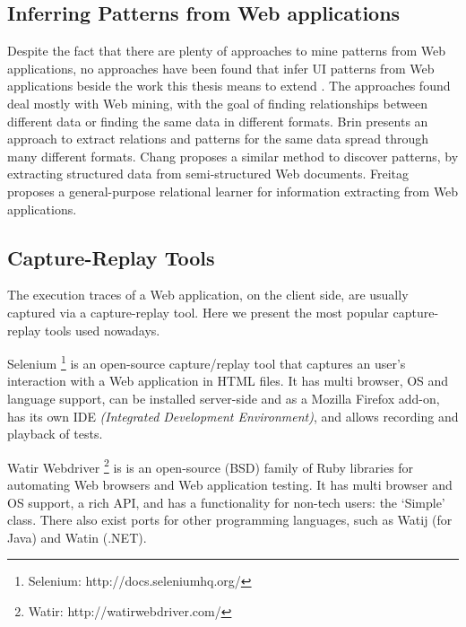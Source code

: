 
\subsection{Inferring Patterns from Web applications}
Despite the fact that there are plenty of approaches to mine patterns from Web applications, no approaches have been found that infer UI patterns from Web applications beside the work this thesis means to extend \cite{nabuco2013inferring, morgado2012gui}. The approaches found deal mostly with Web mining, with the goal of finding relationships between different data or finding the same data in different formats. Brin \cite{brin1999extracting} presents an approach to extract relations and patterns for the same data spread through many different formats. Chang \cite{chang2003automatic} proposes a similar method to discover patterns, by extracting structured data from semi-structured Web documents. Freitag \cite{freitag1998information} proposes a general-purpose relational learner for information extracting from Web applications.


\subsection{Capture-Replay Tools}
The execution traces of a Web application, on the client side, are usually captured via a capture-replay tool. Here we present the most popular capture-replay tools used nowadays.

Selenium \footnote{Selenium: http://docs.seleniumhq.org/} is an open-source capture/replay tool that captures an user's interaction with a Web application in HTML files. It has multi browser, OS and language support, can be installed server-side and as a Mozilla Firefox add-on, has its own IDE \textit{(Integrated Development Environment)}, and allows recording and playback of tests.

Watir Webdriver \footnote{Watir: http://watirwebdriver.com/} is is an open-source (BSD) family of Ruby libraries for automating Web browsers and Web application testing. It has multi browser and OS support, a rich API, and has a functionality for non-tech users: the ‘Simple’ class. There also exist ports for other programming languages, such as Watij (for Java) and Watin (.NET).

